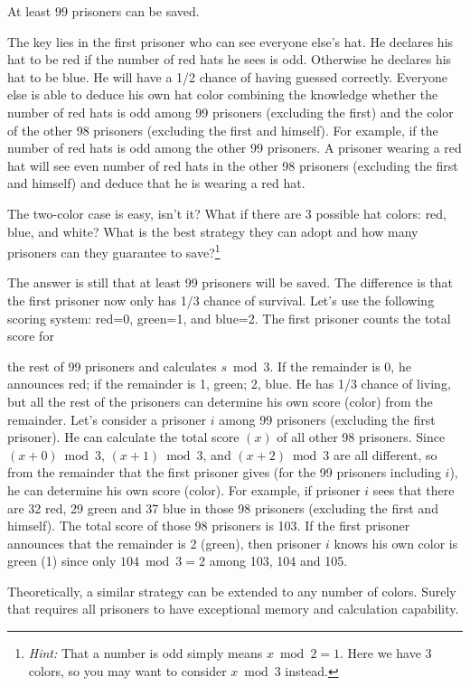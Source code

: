 \begin{solution}
At least 99 prisoners can be saved.

The key lies in the first prisoner who can see everyone else's hat. He declares his hat to be
red if the number of red hats he sees is odd. Otherwise he declares his hat to be blue. He
will have a 1/2 chance of having guessed correctly. Everyone else is able to deduce his own
hat color combining the knowledge whether the number of red hats is odd among 99
prisoners (excluding the first) and the color of the other 98 prisoners (excluding the first
and himself). For example, if the number of red hats is odd among the other 99 prisoners.
A prisoner wearing a red hat will see even number of red hats in the other 98 prisoners
(excluding the first and himself) and deduce that he is wearing a red hat.
\end{solution}

\begin{problem}{}
The two-color case is easy, isn't it? What if there are 3 possible hat colors: red, blue, and
white? What is the best strategy they can adopt and how many prisoners can they guarantee
to save?\footnote[15]{\emph{Hint:} That a number is odd simply means $x\bmod 2=1$. Here we have 3 colors, so you may want to consider $x\bmod 3$ instead.}
\end{problem}

\begin{solution}
The answer is still that at least 99 prisoners will be saved. The difference is
that the first prisoner now only has 1/3 chance of survival. Let's use the following scoring
system: red=0, green=1, and blue=2. The first prisoner counts the total score for

the rest of 99 prisoners and calculates $s\bmod 3$. If the remainder is 0, he announces red; if
the remainder is 1, green; 2, blue. He has 1/3 chance of living, but all the rest of the
prisoners can determine his own score (color) from the remainder. Let's consider a prisoner
$i$ among 99 prisoners (excluding the first prisoner). He can calculate the total score $(x)$
of all other 98 prisoners. Since $(x+0)\bmod 3$, $(x+1)\bmod 3$, and $(x+2)\bmod 3$ are all
different, so from the remainder that the first prisoner gives (for the 99 prisoners including
$i$), he can determine his own score (color). For example, if prisoner $i$ sees that there are
32 red, 29 green and 37 blue in those 98 prisoners (excluding the first and himself). The
total score of those 98 prisoners is 103. If the first prisoner announces that the remainder is
2 (green), then prisoner $i$ knows his own color is green (1) since only $104\bmod 3=2$ among
103, 104 and 105.

Theoretically, a similar strategy can be extended to any number of colors. Surely that
requires all prisoners to have exceptional memory and calculation capability.
\end{solution}

